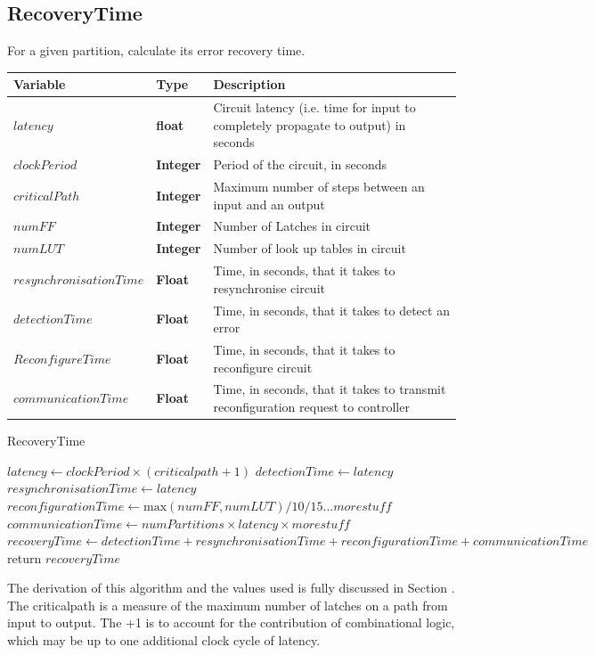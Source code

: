 \documentclass[12pt,final,oneside]{article} %
\begin{document}
\newpage
\subsection{RecoveryTime}
For a given partition, calculate its error recovery time.
\begin{algorithm}
   \begin{center}
        \begin{tabularx}{\linewidth}{llX}
        \toprule
        Variable & Type & Description\\
        \midrule
        $latency$ &\bf  float & Circuit latency (i.e. time for input to completely propagate to output) in seconds\\
        $clockPeriod$ &\bf  Integer & Period of the circuit, in seconds\\
        $criticalPath$ &\bf  Integer & Maximum number of steps between an input and an output\\
        $numFF$ &\bf  Integer & Number of Latches in circuit\\
        $numLUT$ &\bf  Integer & Number of look up tables in circuit\\
        $resynchronisationTime$ &\bf  Float & Time, in seconds, that it takes to resynchronise circuit\\
        $detectionTime$ &\bf  Float & Time, in seconds, that it takes to detect an error\\
        $ReconfigureTime$ &\bf  Float & Time, in seconds, that it takes to reconfigure circuit\\
        $communicationTime$ &\bf  Float & Time, in seconds, that it takes to transmit reconfiguration request to controller\\
        \bottomrule
        \end{tabularx}
    \end{center}
   \caption{RecoveryTime}\label{recoverytime}
   \begin{algorithmic}[1]
            \State $latency \gets clockPeriod\times{}(criticalpath+1)$
            \State $detectionTime \gets latency$
            \State $resynchronisationTime \gets latency$
            \State $reconfigurationTime \gets \mbox{max}(numFF, numLUT)/10/15...more stuff$
            \State $communicationTime \gets numPartitions\times{}latency\times{}more stuff$
            \State $recoveryTime \gets detectionTime+resynchronisationTime+reconfigurationTime+communicationTime$
            \State return $recoveryTime$
         \EndProcedure
   \end{algorithmic}
\end{algorithm}
The derivation of this algorithm and the values used is fully discussed in Section . The criticalpath is a measure of the maximum number of latches on a path from input to output. The +1 is to account for the contribution of combinational logic, which may be up to one additional clock cycle of latency.
\end{document}
